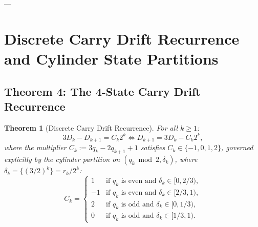 \documentclass[11pt,reqno]{amsart}
\newtheorem{theorem}{Theorem}[section]
\theoremstyle{definition}
\numberwithin{equation}{section}
\begin{document}
---

\section{Discrete Carry Drift Recurrence and Cylinder State Partitions}

\subsection{Theorem 4: The 4-State Carry Drift Recurrence}

\begin{theorem}[Discrete Carry Drift Recurrence]\label{thm:carry_drift}
For all $k \ge 1$:
\begin{equation}\label{eq:drift_equation}
3 D_k - D_{k+1} = C_k 2^k \iff D_{k+1} = 3 D_k - C_k 2^k,
\end{equation}
where the multiplier $C_k := 3 q_k - 2 q_{k+1} + 1$ satisfies $C_k \in \{-1, 0, 1, 2\}$, governed explicitly by the cylinder partition on $(q_k \bmod 2, \delta_k)$, where $\delta_k = \{(3/2)^k\} = r_k / 2^k$:
\begin{equation}\label{eq:state_partition}
C_k = \begin{cases}
1 & \text{if } q_k \text{ is even and } \delta_k \in [0, 2/3), \\
-1 & \text{if } q_k \text{ is even and } \delta_k \in [2/3, 1), \\
2 & \text{if } q_k \text{ is odd and } \delta_k \in [0, 1/3), \\
0 & \text{if } q_k \text{ is odd and } \delta_k \in [1/3, 1).
\end{cases}
\end{equation}
\end{theorem}
\end{document}
